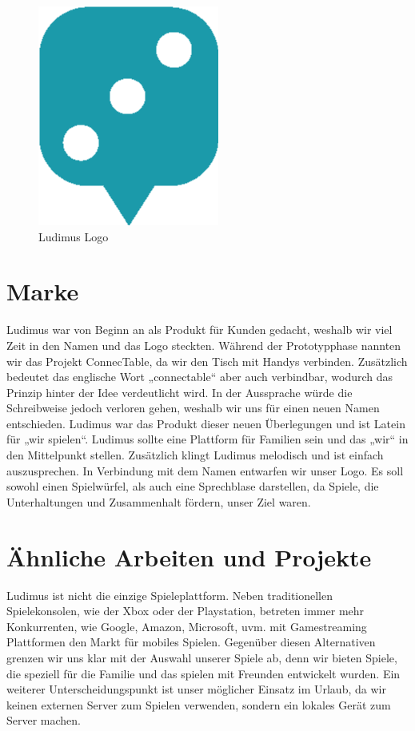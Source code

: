 \begin{figure}
\begin{center}
	\includegraphics[scale=0.3]{images/ludimusLogo.png}
\end{center}
	\caption{Ludimus Logo}
\end{figure}

\section{Marke}
Ludimus war von Beginn an als Produkt für Kunden gedacht, weshalb wir viel Zeit in den Namen und das Logo steckten. Während der Prototypphase nannten wir das Projekt ConnecTable, da wir den Tisch mit Handys verbinden. Zusätzlich bedeutet das englische Wort „connectable“ aber auch verbindbar, wodurch das Prinzip hinter der Idee verdeutlicht wird. In der Aussprache würde die Schreibweise jedoch verloren gehen, weshalb wir uns für einen neuen Namen entschieden. Ludimus war das Produkt dieser neuen Überlegungen und ist Latein für „wir spielen“. Ludimus sollte eine Plattform für Familien sein und das „wir“ in den Mittelpunkt stellen. Zusätzlich klingt Ludimus melodisch und ist einfach auszusprechen. In Verbindung mit dem Namen entwarfen wir unser Logo. Es soll sowohl einen Spielwürfel, als auch eine Sprechblase darstellen, da Spiele, die Unterhaltungen und Zusammenhalt fördern, unser Ziel waren. 


\section{Ähnliche Arbeiten und Projekte}
Ludimus ist nicht die einzige Spieleplattform. Neben traditionellen Spielekonsolen, wie der Xbox oder der Playstation, betreten immer mehr Konkurrenten, wie Google, Amazon, Microsoft, uvm. mit Gamestreaming Plattformen den Markt für mobiles Spielen. Gegenüber diesen Alternativen grenzen wir uns klar mit der Auswahl unserer Spiele ab, denn wir bieten Spiele, die speziell für die Familie und das spielen mit Freunden entwickelt wurden. Ein weiterer Unterscheidungspunkt ist unser möglicher Einsatz im Urlaub, da wir keinen externen Server zum Spielen verwenden, sondern ein lokales Gerät zum Server machen.

